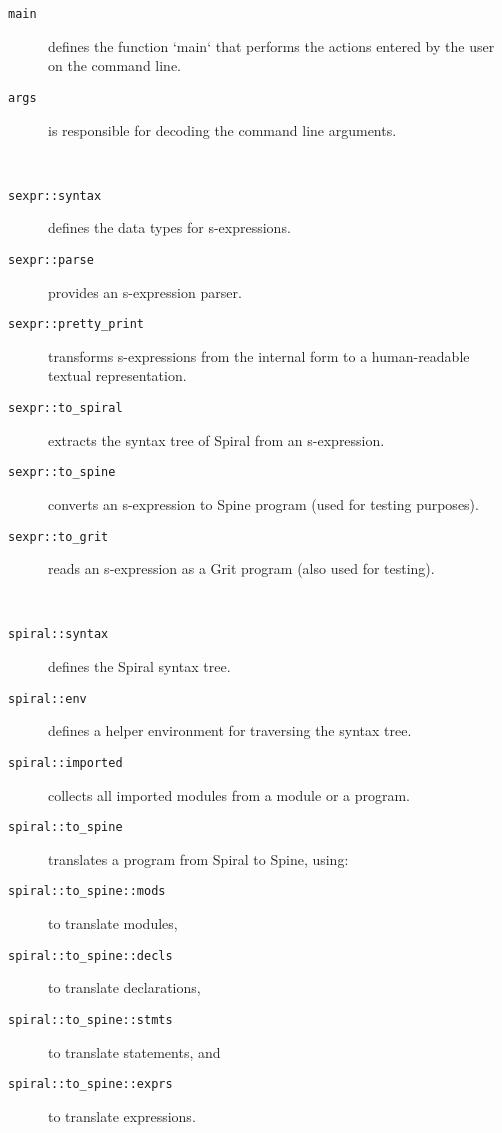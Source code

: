 \begin{description}
  \item[\texttt{main}] defines the function `main` that performs the actions
    entered by the user on the command line.
  \item[\texttt{args}] is responsible for decoding the command line arguments.
\end{description}
~
\begin{description}
  \item[\texttt{sexpr::syntax}] defines the data types for s-expressions.
  \item[\texttt{sexpr::parse}] provides an s-expression parser.
  \item[\texttt{sexpr::pretty_print}] transforms s-expressions from the internal
    form to a human-readable textual representation.
  \item[\texttt{sexpr::to_spiral}] extracts the syntax tree of Spiral from
    an s-expression.
  \item[\texttt{sexpr::to_spine}] converts an s-expression to Spine program
    (used for testing purposes).
  \item[\texttt{sexpr::to_grit}] reads an s-expression as a Grit program (also
    used for testing).
\end{description}
~
\begin{description}
  \item[\texttt{spiral::syntax}] defines the Spiral syntax tree.
  \item[\texttt{spiral::env}] defines a helper environment for traversing the
    syntax tree.
  \item[\texttt{spiral::imported}] collects all imported modules from a module
    or a program.
  \item[\texttt{spiral::to_spine}] translates a program from Spiral to Spine,
    using:
  \item[\texttt{spiral::to_spine::mods}] to translate modules,
  \item[\texttt{spiral::to_spine::decls}] to translate declarations,
  \item[\texttt{spiral::to_spine::stmts}] to translate statements, and
  \item[\texttt{spiral::to_spine::exprs}] to translate expressions.
\end{description}
~
